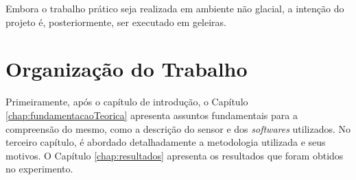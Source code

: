 Embora o trabalho prático seja realizada em ambiente não glacial, a intenção do projeto é, posteriormente, ser executado em geleiras.

\section{Organização do Trabalho}
\label{sec:organizacaoTrabalho}

Primeiramente, após o capítulo de introdução, o Capítulo \ref{chap:fundamentacaoTeorica} apresenta assuntos fundamentais para a compreensão do mesmo, como a descrição do sensor e dos \textit{softwares} utilizados. No terceiro capítulo, é abordado detalhadamente a metodologia utilizada e seus motivos. O Capítulo \ref{chap:resultados} apresenta os resultados que foram obtidos no experimento. 
